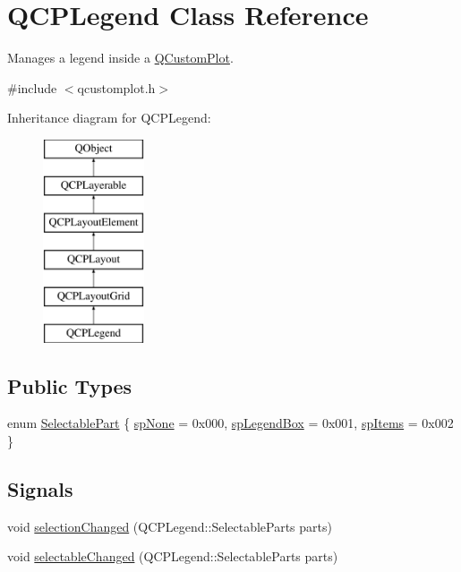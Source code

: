 \hypertarget{class_q_c_p_legend}{}\section{Q\+C\+P\+Legend Class Reference}
\label{class_q_c_p_legend}


Manages a legend inside a \hyperlink{class_q_custom_plot}{Q\+Custom\+Plot}.  




{\ttfamily \#include $<$qcustomplot.\+h$>$}

Inheritance diagram for Q\+C\+P\+Legend\+:\begin{figure}[H]
\begin{center}
\leavevmode
\includegraphics[height=6.000000cm]{class_q_c_p_legend}
\end{center}
\end{figure}
\subsection*{Public Types}
\begin{DoxyCompactItemize}
\item 
enum \hyperlink{class_q_c_p_legend_a5404de8bc1e4a994ca4ae69e2c7072f1}{Selectable\+Part} \{ \hyperlink{class_q_c_p_legend_a5404de8bc1e4a994ca4ae69e2c7072f1a378201c07d500af7126e3ec91652eed7}{sp\+None} = 0x000, 
\hyperlink{class_q_c_p_legend_a5404de8bc1e4a994ca4ae69e2c7072f1a0fa4758962a46fa1dc9da818abae23c4}{sp\+Legend\+Box} = 0x001, 
\hyperlink{class_q_c_p_legend_a5404de8bc1e4a994ca4ae69e2c7072f1a768bfb95f323db4c66473375032c0af7}{sp\+Items} = 0x002
 \}
\end{DoxyCompactItemize}
\subsection*{Signals}
\begin{DoxyCompactItemize}
\item 
void \hyperlink{class_q_c_p_legend_a82c88464edac07a9eefaf3906268df3b}{selection\+Changed} (Q\+C\+P\+Legend\+::\+Selectable\+Parts parts)
\item 
void \hyperlink{class_q_c_p_legend_a8a77300fd0976d6bdd8000f4e8d114b8}{selectable\+Changed} (Q\+C\+P\+Legend\+::\+Selectable\+Parts parts)
\end{DoxyCompactItemize}
